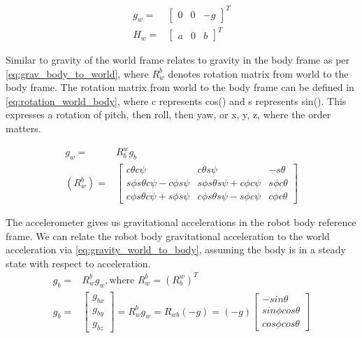 \documentclass[conference]{IEEEtran}
\begin{document}
\begin{align}
g_w =& \begin{bmatrix}0& 0& -g\end{bmatrix}^T \label{eq:grav} \\
H_w =& \begin{bmatrix}a& 0& b\end{bmatrix}^T \label{eq:magn}
\end{align}


Similar to \cite{b19} gravity of the world frame relates to gravity in the body frame as per \eqref{eq:grav_body_to_world}, where $R_{w}^b$ denotes rotation matrix from world to the body frame. The rotation matrix from world to the body frame can be defined in \eqref{eq:rotation_world_body}, where c represents cos() and s represents sin(). This expresses a rotation of pitch, then roll, then yaw, or x, y, z, where the order matters.

\begin{align}
g_w =& R_{b}^w g_b \label{eq:grav_body_to_world} \\
(R_{w}^b) =& \begin{bmatrix} c\theta c\psi& c\theta s\psi& -s\theta\\
					  s \phi s\theta c\psi - c \phi s\psi& s\phi s\theta s\psi + c\phi c\psi& s \phi c \theta\\
					 c \phi s \theta c \psi + s \phi s \psi& c \phi s \theta s\psi - s \phi c\psi& c \phi c \theta	\end{bmatrix}\label{eq:rotation_world_body}
\end{align} 

The accelerometer gives us gravitational accelerations in the robot body reference frame. We can relate the robot body gravitational acceleration to the world acceleration via \eqref{eq:gravity_world_to_body}, assuming the body is in a steady state with respect to acceleration.
\begin{align}
g_b =& R_w^b g_w, \text{where } R_w^b = (R_b^w)^T\\
g_b =& \begin{bmatrix} g_{bx}\\ g_{by}\\ g_{bz} \end{bmatrix} = R_{w}^b g_w = R_{wb} (-g) = (-g) \begin{bmatrix} -sin \theta \\ sin \phi cos \theta \\ cos \phi cos \theta \end{bmatrix} \label{eq:gravity_world_to_body}
\end{align}
\end{document}
